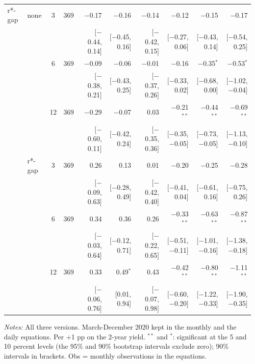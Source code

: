 \begin{longtable}{llcrrrrrrr}
\addlinespace
r*-gap & none & 3 & 369 & $-$0.17 & $-$0.16 & $-$0.14 & $-$0.12 & $-$0.15 & $-$0.17\\
 & & & & {\scriptsize [$-$0.44, 0.14]} & {\scriptsize [$-$0.45, 0.16]} & {\scriptsize [$-$0.42, 0.15]} & {\scriptsize [$-$0.27, 0.06]} & {\scriptsize [$-$0.43, 0.14]} & {\scriptsize [$-$0.54, 0.25]}\\
 &  & 6 & 369 & $-$0.09 & $-$0.06 & $-$0.01 & $-$0.16 & $-$0.35$^{*}$ & $-$0.53$^{*}$\\
 & & & & {\scriptsize [$-$0.38, 0.21]} & {\scriptsize [$-$0.43, 0.25]} & {\scriptsize [$-$0.37, 0.26]} & {\scriptsize [$-$0.33, 0.02]} & {\scriptsize [$-$0.68, 0.00]} & {\scriptsize [$-$1.02, $-$0.04]}\\
 &  & 12 & 369 & $-$0.29 & $-$0.07 & 0.03 & $-$0.21$^{**}$ & $-$0.44$^{**}$ & $-$0.69$^{**}$\\
 & & & & {\scriptsize [$-$0.60, 0.11]} & {\scriptsize [$-$0.42, 0.24]} & {\scriptsize [$-$0.35, 0.36]} & {\scriptsize [$-$0.35, $-$0.05]} & {\scriptsize [$-$0.73, $-$0.05]} & {\scriptsize [$-$1.13, $-$0.10]}\\
 & r*-gap & 3 & 369 & 0.26 & 0.13 & 0.01 & $-$0.20 & $-$0.25 & $-$0.28\\
 & & & & {\scriptsize [$-$0.09, 0.63]} & {\scriptsize [$-$0.28, 0.49]} & {\scriptsize [$-$0.42, 0.40]} & {\scriptsize [$-$0.41, 0.04]} & {\scriptsize [$-$0.61, 0.16]} & {\scriptsize [$-$0.75, 0.26]}\\
 &  & 6 & 369 & 0.34 & 0.36 & 0.26 & $-$0.33$^{**}$ & $-$0.63$^{**}$ & $-$0.87$^{**}$\\
 & & & & {\scriptsize [$-$0.03, 0.64]} & {\scriptsize [$-$0.12, 0.71]} & {\scriptsize [$-$0.22, 0.65]} & {\scriptsize [$-$0.51, $-$0.11]} & {\scriptsize [$-$1.01, $-$0.16]} & {\scriptsize [$-$1.38, $-$0.18]}\\
 &  & 12 & 369 & 0.33 & 0.49$^{*}$ & 0.43 & $-$0.42$^{**}$ & $-$0.80$^{**}$ & $-$1.11$^{**}$\\
 & & & & {\scriptsize [$-$0.06, 0.76]} & {\scriptsize [0.01, 0.94]} & {\scriptsize [$-$0.07, 0.98]} & {\scriptsize [$-$0.60, $-$0.20]} & {\scriptsize [$-$1.22, $-$0.33]} & {\scriptsize [$-$1.90, $-$0.35]}\\
\end{longtable}
\begin{flushleft}\footnotesize\textit{Notes:} All three versions. March-December 2020 kept in the monthly and the daily equations. Per +1 pp on the 2-year yield. $^{**}$ and $^{*}$: significant at the 5 and 10 percent levels (the 95\% and 90\% bootstrap intervals exclude zero); 90\% intervals in brackets. Obs = monthly observations in the equations.\end{flushleft}
\endgroup
